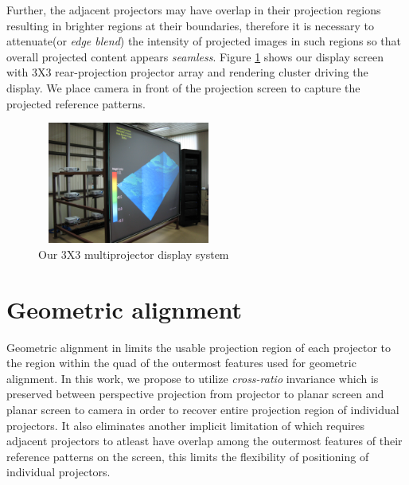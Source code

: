 \documentclass[letterpaper,10pt,conference]{/home/pranav/Desktop/Publication_work/latex_class_files/IEEEtran}
\begin{document}
Further, the adjacent projectors may have overlap in their projection regions resulting in brighter regions at their boundaries, therefore it is necessary to attenuate(or \textit{edge blend}) the intensity of projected images in such regions so that overall projected content appears \textit{seamless}. Figure \ref{setup} shows our display screen with 3X3 rear-projection projector array and rendering cluster driving the display. We place camera in front of the projection screen to capture the projected reference patterns.
\begin{figure}
\centering
\includegraphics[width=6cm,height=4cm]{figures/system_setup.jpg}
\caption{Our 3X3 multiprojector display system}
\label{setup}
\end{figure}



\section{Geometric alignment}
Geometric alignment in \cite{brown} limits the usable projection region of each projector to the region within the quad of the outermost features used for geometric alignment. In this work, we propose to utilize \textit{cross-ratio}\cite{hartley} invariance which is preserved between perspective projection from projector to planar screen and planar screen to camera in order to recover entire projection region of individual projectors. It also eliminates another implicit limitation of \cite{brown} which requires adjacent projectors to atleast have overlap among the outermost features of their reference patterns on the screen, this limits the flexibility of positioning of individual projectors. 
\end{document}
